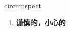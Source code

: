 
\begin{frame}
{\huge circumspect}
\begin{center}
\begin{enumerate}\Large
  \item \textbf{谨慎的，小心的}
\end{enumerate}
\end{center}
\end{frame}
